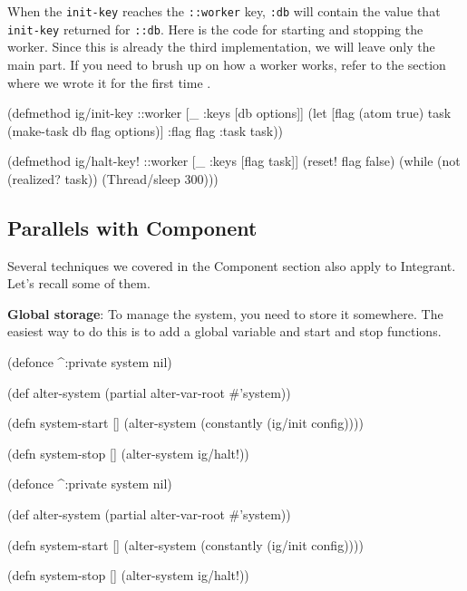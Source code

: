 When the \verb|init-key| reaches the \verb|::worker| key, \verb|:db| will contain the value that \verb|init-key| returned for \verb|::db|. Here is the code for starting and stopping the worker. Since this is already the third implementation, we will leave only the main part. If you need to brush up on how a worker works, refer to the section where we wrote it for the first time .

\begin{english}
  \begin{clojure}
(defmethod ig/init-key ::worker
  [_ {:keys [db options]}]
  (let [flag (atom true)
        task (make-task db flag options)]
    {:flag flag :task task}))

(defmethod ig/halt-key! ::worker
  [_ {:keys [flag task]}]
  (reset! flag false)
  (while (not (realized? task))
    (Thread/sleep 300)))
  \end{clojure}
\end{english}

\subsection{Parallels with Component}

Several techniques we covered in the Component section also apply to Integrant. Let's recall some of them.


\textbf{Global storage}: To manage the system, you need to store it somewhere. The easiest way to do this is to add a global variable and start and stop functions.

\ifnarrow

\begin{english}
  \begin{clojure}
(defonce ^:private system nil)

(def alter-system
  (partial alter-var-root #'system))

(defn system-start []
  (alter-system
    (constantly (ig/init config))))

(defn system-stop []
  (alter-system ig/halt!))
  \end{clojure}
\end{english}

\else

\begin{english}
  \begin{clojure}
(defonce ^:private system nil)

(def alter-system (partial alter-var-root #'system))

(defn system-start []
  (alter-system (constantly (ig/init config))))

(defn system-stop []
  (alter-system ig/halt!))
  \end{clojure}
\end{english}

